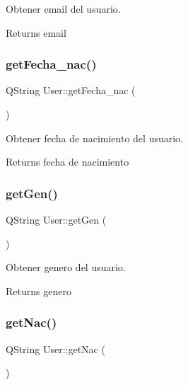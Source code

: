 Obtener email del usuario. 

\begin{DoxyReturn}{Returns}
email 
\end{DoxyReturn}
\mbox{\label{classUser_a038bc7578cc67dc65dcc37cab56011cc}} 
\subsubsection{\texorpdfstring{get\+Fecha\+\_\+nac()}{getFecha\_nac()}}
{\footnotesize\ttfamily Q\+String User\+::get\+Fecha\+\_\+nac (\begin{DoxyParamCaption}{ }\end{DoxyParamCaption})}



Obtener fecha de nacimiento del usuario. 

\begin{DoxyReturn}{Returns}
fecha de nacimiento 
\end{DoxyReturn}
\mbox{\label{classUser_af6978ab530e6b4516575c569245e1cb1}} 
\subsubsection{\texorpdfstring{get\+Gen()}{getGen()}}
{\footnotesize\ttfamily Q\+String User\+::get\+Gen (\begin{DoxyParamCaption}{ }\end{DoxyParamCaption})}



Obtener genero del usuario. 

\begin{DoxyReturn}{Returns}
genero 
\end{DoxyReturn}
\mbox{\label{classUser_a35bb4fee2f8b12cf69eb25b7949cd85c}} 
\subsubsection{\texorpdfstring{get\+Nac()}{getNac()}}
{\footnotesize\ttfamily Q\+String User\+::get\+Nac (\begin{DoxyParamCaption}{ }\end{DoxyParamCaption})}



